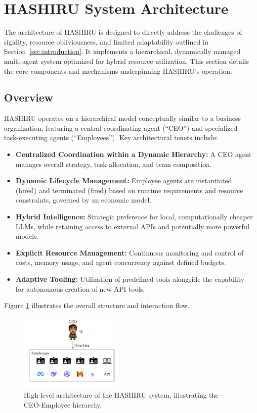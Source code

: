 \documentclass[conference]{IEEEtran}
\begin{document}
\section{HASHIRU System Architecture}
\label{sec:architecture}

The architecture of HASHIRU is designed to directly address the challenges of rigidity, resource obliviousness, and limited adaptability outlined in Section~\ref{sec:introduction}. It implements a hierarchical, dynamically managed multi-agent system optimized for hybrid resource utilization. This section details the core components and mechanisms underpinning HASHIRU's operation.

\subsection{Overview}
HASHIRU operates on a hierarchical model conceptually similar to a business organization, featuring a central coordinating agent (``CEO'') and specialized task-executing agents (``Employees''). Key architectural tenets include:
\begin{itemize}
    \item \textbf{Centralized Coordination within a Dynamic Hierarchy:} A CEO agent manages overall strategy, task allocation, and team composition.
    \item \textbf{Dynamic Lifecycle Management:} Employee agents are instantiated (hired) and terminated (fired) based on runtime requirements and resource constraints, governed by an economic model.
    \item \textbf{Hybrid Intelligence:} Strategic preference for local, computationally cheaper LLMs, while retaining access to external APIs and potentially more powerful models.
    \item \textbf{Explicit Resource Management:} Continuous monitoring and control of costs, memory usage, and agent concurrency against defined budgets.
    \item \textbf{Adaptive Tooling:} Utilization of predefined tools alongside the capability for autonomous creation of new API tools.
\end{itemize}
Figure \ref{fig:arch} illustrates the overall structure and interaction flow.

\begin{figure}[ht]
    \centering
    \includegraphics[width=0.45\textwidth]{HASHIRU.pdf}
    \caption{High-level architecture of the HASHIRU system, illustrating the CEO-Employee hierarchy.}
    \label{fig:arch}
\end{figure}
\end{document}
